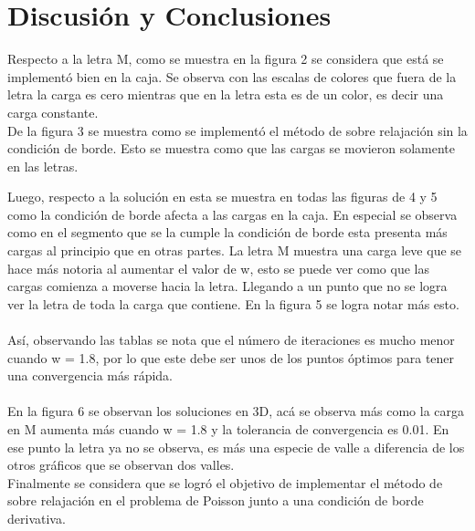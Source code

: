 \documentclass[letterpaper,oneside]{article}
\begin{document}
\newpage
\section{Discusión y Conclusiones}
Respecto a la letra M, como se muestra en la figura 2 se considera que está se implementó bien en la caja. Se observa con las escalas de colores que fuera de la letra la carga es cero mientras que en la letra esta es de un color, es decir una carga constante. \\

De la figura 3 se muestra como se implementó el método de sobre relajación  sin la condición de borde. Esto se muestra como que las cargas se movieron solamente en las letras.

Luego, respecto a la solución en esta se muestra en todas las figuras de 4 y 5 como la condición de borde afecta a las cargas en la caja. En especial se observa como en el segmento que se la cumple la condición de borde esta presenta más cargas al principio que en otras partes. La letra M muestra una carga leve que se  hace más notoria al aumentar el valor de w, esto se puede ver como que las cargas comienza a moverse hacia la letra. Llegando a un punto que no se logra ver la letra de toda la carga que contiene. En la figura 5 se logra notar más esto.\\ \\

Así, observando las tablas se nota que el número de iteraciones es mucho menor cuando w = 1.8, por lo que este debe ser unos de los puntos óptimos para tener una convergencia más rápida. \\ \\

En la figura 6 se observan los soluciones en 3D, acá se observa más como la carga en M aumenta más cuando w = 1.8 y la tolerancia de convergencia es 0.01. En ese punto la letra ya no se observa, es más una especie de valle a diferencia de los otros gráficos que se observan dos valles. \\

Finalmente se considera que se logró el objetivo de implementar el método de sobre relajación en el problema de Poisson junto a una condición de borde derivativa.









\end{document}
